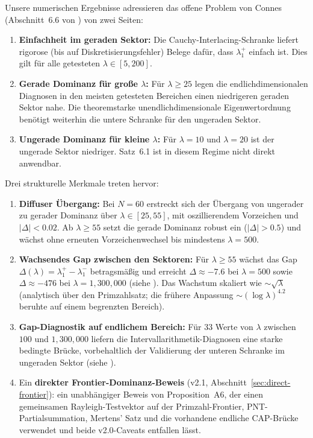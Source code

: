 ﻿\documentclass[12pt,a4paper]{article}
\theoremstyle{definition}
\theoremstyle{remark}
\begin{document}
Unsere numerischen Ergebnisse adressieren das offene Problem von Connes (Abschnitt~6.6 von \cite{Connes2026}) von zwei Seiten:
\begin{enumerate}
  \item \textbf{Einfachheit im geraden Sektor:} Die Cauchy-Interlacing-Schranke liefert rigorose (bis auf Diskretisierungsfehler) Belege dafür, dass $\lambda_1^+$ einfach ist. Dies gilt für alle getesteten $\lambda \in [5, 200]$.
  \item \textbf{Gerade Dominanz für große $\lambda$:} Für $\lambda \geq 25$ legen die endlichdimensionalen Diagnosen in den meisten getesteten Bereichen einen niedrigeren geraden Sektor nahe. Die theoremstarke unendlichdimensionale Eigenwertordnung benötigt weiterhin die untere Schranke für den ungeraden Sektor.
  \item \textbf{Ungerade Dominanz für kleine $\lambda$:} Für $\lambda = 10$ und $\lambda = 20$ ist der ungerade Sektor niedriger. Satz~6.1 ist in diesem Regime nicht direkt anwendbar.
\end{enumerate}

Drei strukturelle Merkmale treten hervor:

\begin{enumerate}
  \item \textbf{Diffuser Übergang:} Bei $N=60$ erstreckt sich der Übergang von ungerader zu gerader Dominanz über $\lambda \in [25, 55]$, mit oszillierendem Vorzeichen und $|\Delta| < 0.02$. Ab $\lambda \geq 55$ setzt die gerade Dominanz robust ein ($|\Delta| > 0.5$) und wächst ohne erneuten Vorzeichenwechsel bis mindestens $\lambda = 500$.

  \item \textbf{Wachsendes Gap zwischen den Sektoren:} Für $\lambda \geq 55$ wächst das Gap $\Delta(\lambda) = \lambda_1^+ - \lambda_1^-$ betragsmäßig und erreicht $\Delta \approx -7.6$ bei $\lambda = 500$ sowie $\Delta \approx -476$ bei $\lambda = 1{,}300{,}000$ (siehe ). Das Wachstum skaliert wie $\sim\!\sqrt{\lambda}$ (analytisch über den Primzahlsatz; die frühere Anpassung $\sim\!(\log\lambda)^{4.2}$ beruhte auf einem begrenzten Bereich).

  \item \textbf{Gap-Diagnostik auf endlichem Bereich:} Für $33$ Werte von $\lambda$ zwischen $100$ und $1{,}300{,}000$ liefern die Intervallarithmetik-Diagnosen eine starke bedingte Brücke, vorbehaltlich der Validierung der unteren Schranke im ungeraden Sektor (siehe ).

  \item Ein \textbf{direkter Frontier-Dominanz-Beweis} (v2.1, Abschnitt~\ref{sec:direct-frontier}): ein unabhängiger Beweis von Proposition~A6, der einen gemeinsamen Rayleigh-Testvektor auf der Primzahl-Frontier, PNT-Partialsummation, Mertens' Satz und die vorhandene endliche CAP-Brücke verwendet und beide v2.0-Caveats entfallen lässt.
\end{enumerate}
\end{document}
